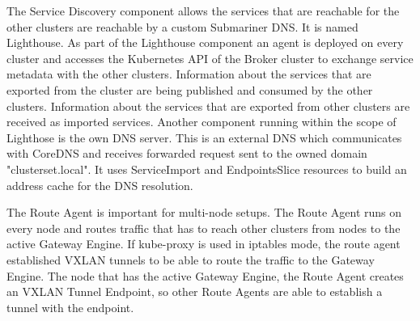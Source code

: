 The Service Discovery component allows the services that are reachable for the other clusters are reachable by a custom Submariner DNS. 
It is named Lighthouse.
As part of the Lighthouse component an agent is deployed on every cluster and accesses the Kubernetes API of the Broker cluster to exchange service metadata with the other clusters.
Information about the services that are exported from the cluster are being published and consumed by the other clusters.
Information about the services that are exported from other clusters are received as imported services.
Another component running within the scope of Lighthose is the own DNS server.
This is an external DNS which communicates with CoreDNS and receives forwarded request sent to the owned domain "clusterset.local".
It uses ServiceImport and EndpointsSlice resources to build an address cache for the DNS resolution.

The Route Agent is important for multi-node setups.
The Route Agent runs on every node and routes traffic that has to reach other clusters from nodes to the active Gateway Engine.
If kube-proxy is used in iptables mode, the route agent established VXLAN tunnels to be able to route the traffic to the Gateway Engine.
The node that has the active Gateway Engine, the Route Agent creates an VXLAN Tunnel Endpoint, so other Route Agents are able to establish a tunnel with the endpoint.








